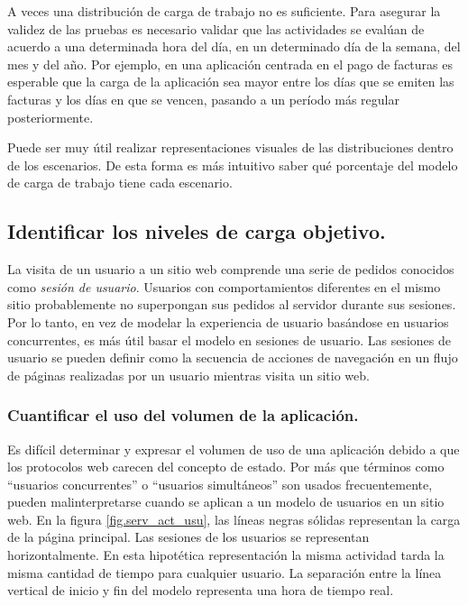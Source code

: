 A veces una distribución de carga de trabajo no es suficiente. Para asegurar la validez de las pruebas es necesario validar que las actividades se evalúan de acuerdo a una
determinada hora del día, en un determinado día de la semana, del mes y del año. Por ejemplo, en una aplicación centrada en el pago de facturas es esperable que la carga de la
aplicación sea mayor entre los días que se emiten las facturas y los días en que se vencen, pasando a un período más regular posteriormente.

Puede ser muy útil realizar representaciones visuales de las distribuciones dentro de los escenarios. De esta forma es más intuitivo saber qué porcentaje del modelo de carga de
trabajo tiene cada escenario.

\subsection{Identificar los niveles de carga objetivo.}
La visita de un usuario a un sitio web comprende una serie de pedidos conocidos como \emph{sesión de usuario}. Usuarios con comportamientos diferentes en el mismo sitio
probablemente no superpongan sus pedidos al servidor durante sus sesiones. Por lo tanto, en vez de modelar la experiencia de usuario basándose en usuarios concurrentes, es más
útil basar el modelo en sesiones de usuario. Las sesiones de usuario se pueden definir como la secuencia de acciones de navegación en un flujo de páginas realizadas por un usuario
mientras visita un sitio web.

\subsubsection{Cuantificar el uso del volumen de la aplicación.}

Es difícil determinar y expresar el volumen de uso de una aplicación debido a que los protocolos web carecen del concepto de estado. Por más que términos
como ``usuarios concurrentes'' o ``usuarios simultáneos'' son usados frecuentemente, pueden malinterpretarse cuando se aplican a un modelo de usuarios en un sitio web. En la
figura \ref{fig.serv_act_usu}, las líneas negras sólidas representan la carga de la página principal. Las sesiones de los usuarios se representan horizontalmente. En esta hipotética
representación la misma actividad tarda la misma cantidad de tiempo para cualquier usuario. La separación entre la línea vertical de inicio y fin del modelo representa una hora de
tiempo real.

